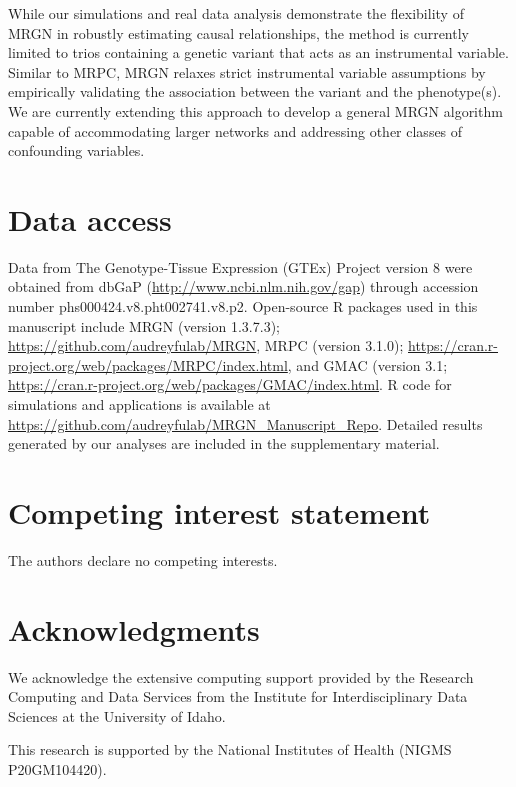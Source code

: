 \documentclass[12pt,letterpaper]{report}
\begin{document}
\begin{doublespace}
While our simulations and real data analysis demonstrate the flexibility of MRGN in robustly estimating causal relationships, the method is currently limited to trios containing a genetic variant that acts as an instrumental variable. Similar to MRPC, MRGN relaxes strict instrumental variable assumptions by empirically validating the association between the variant and the phenotype(s). We are currently extending this approach to develop a general MRGN algorithm capable of accommodating larger networks and addressing other classes of confounding variables.

\end{doublespace}

\section*{Data access}
Data from The Genotype-Tissue Expression (GTEx) Project version 8 were obtained from dbGaP (\url{http://www.ncbi.nlm.nih.gov/gap}) through 
accession number phs000424.v8.pht002741.v8.p2.  Open-source R packages used in this manuscript include MRGN (version 1.3.7.3);  \url{https://github.com/audreyfulab/MRGN}, MRPC (version 3.1.0); \url{https://cran.r-project.org/web/packages/MRPC/index.html}, and GMAC (version 3.1; 
\url{https://cran.r-project.org/web/packages/GMAC/index.html}.  R code for simulations and applications is available at \url{https://github.com/audreyfulab/MRGN_Manuscript_Repo}.  Detailed results generated by our analyses are included in the supplementary 
material.

\section*{Competing interest statement}
The authors declare no competing interests.


\section*{Acknowledgments}
We acknowledge the extensive computing support provided by the Research Computing and Data Services from the Institute for Interdisciplinary Data Sciences at the University of Idaho.

This research is supported by the National Institutes of Health (NIGMS P20GM104420).
\end{document}
